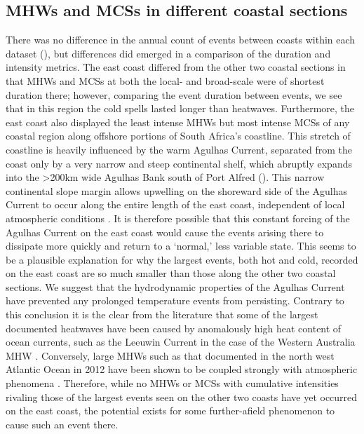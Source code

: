 \documentclass[a4paper,10pt,review]{elsarticle}
\begin{document}
\subsection{MHWs and MCSs in different coastal sections}
There was no difference in the annual count of events between coasts within each dataset (), but differences did emerged in a comparison of the duration and intensity metrics. The east coast differed from the other two coastal sections in that MHWs and MCSs at both the local- and broad-scale were of shortest duration there; however, comparing the event duration between events, we see that in this region the cold spells lasted longer than heatwaves. Furthermore, the east coast also displayed the least intense MHWs but most intense MCSs of any coastal region along offshore portions of South Africa's coastline. This stretch of coastline is heavily influenced by the warm Agulhas Current, separated from the coast only by a very narrow and steep continental shelf, which abruptly expands into the >200km wide Agulhas Bank south of Port Alfred (). This narrow continental slope margin allows upwelling on the shoreward side of the Agulhas Current to occur along the entire length of the east coast, independent of local atmospheric conditions \citep{Lutjeharms2000}. It is therefore possible that this constant forcing of the Agulhas Current on the east coast would cause the events arising there to dissipate more quickly and return to a `normal,' less variable state. This seems to be a plausible explanation for why the largest events, both hot and cold, recorded on the east coast are so much smaller than those along the other two coastal sections. We suggest that the hydrodynamic properties of the Agulhas Current have prevented any prolonged temperature events from persisting. Contrary to this conclusion it is the clear from the literature that some of the largest documented heatwaves have been caused by anomalously high heat content of ocean currents, such as the Leeuwin Current in the case of the Western Australia MHW \citep{Feng2013, Pearce2013, Wernberg2013}. Conversely, large MHWs such as that documented in the north west Atlantic Ocean in 2012 have been shown to be coupled strongly with atmospheric phenomena \citep{Mills2012, Chen2014, Chen2015}. Therefore, while no MHWs or MCSs with cumulative intensities rivaling those of the largest events seen on the other two coasts have yet occurred on the east coast, the potential exists for some further-afield phenomenon to cause such an event there.
\end{document}
